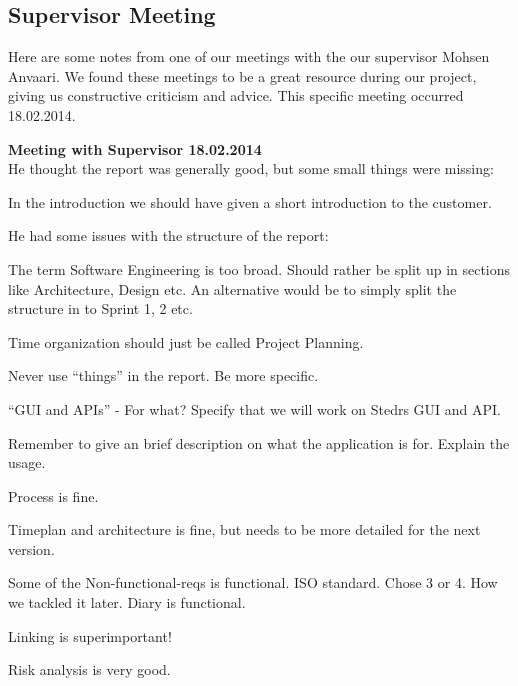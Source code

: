\clearpage

\subsection{Supervisor Meeting}
Here are some notes from one of our meetings with the our supervisor Mohsen Anvaari. 
We found these meetings to be a great resource during our project, giving us constructive criticism and advice. This specific meeting occurred 18.02.2014.

\clearpage
{}

\textbf{Meeting with Supervisor 18.02.2014}\\

He thought the report was generally good, but some small things were missing:

In the introduction we should have given a short introduction to the customer.

He had some issues with the structure of the report:

The term Software Engineering is too broad.
Should rather be split up in sections like Architecture, Design etc. 
An alternative would be to simply split the structure in to Sprint 1, 2 etc.

Time organization should just be called Project Planning.

Never use “things” in the report. Be more specific.

“GUI and APIs” - For what? Specify that we will work on Stedrs GUI and API.

Remember to give an brief description on what the application is for. Explain the usage.

Process is fine.

Timeplan and architecture is fine, but needs to be more detailed for the next version. 

Some of the Non-functional-reqs is functional. ISO standard. Chose 3 or 4. How we tackled it later. Diary is functional.

Linking is superimportant!

Risk analysis is very good.

\clearpage



